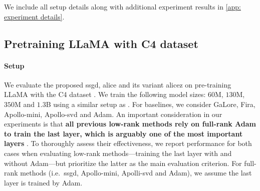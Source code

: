 \label{sec: experiments}
We include all setup details along with additional experiment results in \cref{app: experiment details}.

\subsection{Pretraining LLaMA with C4 dataset}
\label{sbusec: experiment pretrain C4} 
\paragraph{Setup}
We evaluate the proposed \gls{ssgd}, \gls{alice} and its variant \gls{alicez} on pre-training LLaMA \citep{touvron2023llama} with the C4 dataset \citep{raffel2020C4}. We train the following model sizes: $60$M, $130$M, $350$M and $1.3$B using a similar setup as \citet{zhao2024galore, zhu2024apollo}. For baselines, we consider GaLore, Fira, Apollo-mini, Apollo-svd and Adam.
An important consideration in our experiments is that \textbf{all previous low-rank methods rely on full-rank Adam to train the last layer, which is arguably one of the most important layers} \citep{zhao2024deconstructing}. To thoroughly assess their effectiveness, we report performance for both cases when evaluating low-rank methods—training the last layer with and without Adam—but prioritize the latter as the main evaluation criterion. For full-rank methods (i.e.~\gls{ssgd}, Apollo-mini, Apolli-svd and Adam), we assume the last layer is trained by Adam. 

